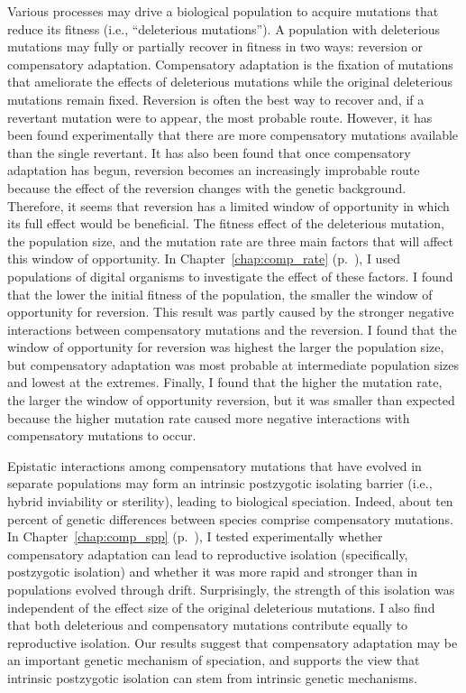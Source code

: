 \begin{doublespace}
Various processes may drive a biological population to acquire mutations
that reduce its fitness (i.e., ``deleterious mutations'').
%
A population with deleterious mutations may fully or partially recover
in fitness in two ways: reversion or compensatory adaptation.
%
Compensatory adaptation is the fixation of mutations
that ameliorate the effects of deleterious mutations
while the original deleterious mutations remain fixed.
%
Reversion is often the best way to recover and,
if a revertant mutation were to appear, the most probable route.
%
However, it has been found experimentally that
there are more compensatory mutations available
than the single revertant.
%
It has also been found that once compensatory adaptation
has begun, reversion becomes an increasingly improbable route
because the effect of the reversion changes with the genetic background.
%
Therefore, it seems that reversion has a limited
window of opportunity in which its full effect would be beneficial.
%
The fitness effect of the deleterious mutation,
the population size, and the mutation rate are three main factors
that will affect this window of opportunity.
%
In Chapter~\ref{chap:comp_rate} (p.~\pageref{chap:comp_rate}),
I used populations of digital organisms
to investigate the effect of these factors.
%
I found that the lower the initial fitness of the population,
the smaller the window of opportunity for reversion.
%
This result was partly caused by the stronger negative interactions
between compensatory mutations and the reversion.
%
I found that the window of opportunity for reversion
was highest the larger the population size,
but compensatory adaptation was most probable
at intermediate population sizes and lowest at the extremes.
%
Finally, I found that the higher the mutation rate,
the larger the window of opportunity reversion,
but it was smaller than expected because
the higher mutation rate caused more negative interactions
with compensatory mutations to occur.



Epistatic interactions among compensatory mutations that have
evolved in separate populations may form an intrinsic
postzygotic isolating barrier (i.e., hybrid inviability or sterility),
leading to biological speciation.
%
Indeed, about ten percent of genetic differences between species
comprise compensatory mutations.
%
In Chapter~\ref{chap:comp_spp} (p.~\pageref{chap:comp_spp}),
I tested experimentally whether compensatory adaptation
can lead to reproductive isolation (specifically, postzygotic isolation)
and whether it was more rapid and stronger
than in populations evolved through drift.
%
Surprisingly, the strength of this isolation was independent
of the effect size of the original deleterious mutations.
%
I also find that
both deleterious and compensatory mutations
contribute equally to reproductive isolation.
%
Our results suggest that compensatory adaptation may be
an important genetic mechanism of speciation,
and supports the view that intrinsic postzygotic isolation
can stem from intrinsic genetic mechanisms.




\end{doublespace}
